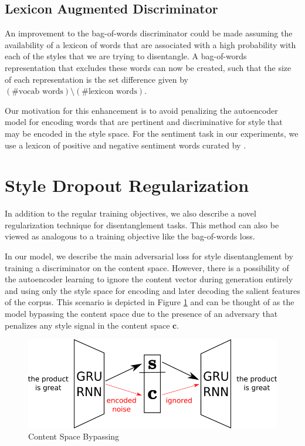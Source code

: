 \subsection{Lexicon Augmented Discriminator}

An improvement to the bag-of-words discriminator could be made assuming the availability of a lexicon of words that are associated with a high probability with each of the styles that we are trying to disentangle.  A bag-of-words representation that excludes these words can now be created, such that the size of each representation is the set difference given by $(\text{\# vocab words}) \setminus (\text{\# lexicon words})$.

Our motivation for this enhancement is to avoid penalizing the autoencoder model for encoding words that are pertinent and discriminative for style that may be encoded in the style space. For the sentiment task in our experiments, we use a lexicon of positive and negative sentiment words curated by \cite{hu2004mining}.


\section{Style Dropout Regularization} \label{sec:style-dropout}

In addition to the regular training objectives, we also describe a novel regularization technique for disentanglement tasks. This method can also be viewed as analogous to a training objective like the bag-of-words loss.

In our model, we describe the main adversarial loss for style disentanglement by training a discriminator on the content space. However, there is a possibility of the autoencoder learning to ignore the content vector during generation entirely and using only the style space for encoding and later decoding the salient features of the corpus. This scenario is depicted in Figure \ref{fig:model-content-bypass} and can be thought of as the model bypassing the content space due to the presence of an adversary that penalizes any style signal in the content space $\bm c$.

\begin{figure}[ht]
	\centering
	\includegraphics[width=\linewidth]{images/model-content-bypass}
	\caption{Content Space Bypassing}
	\label{fig:model-content-bypass}
\end{figure}

